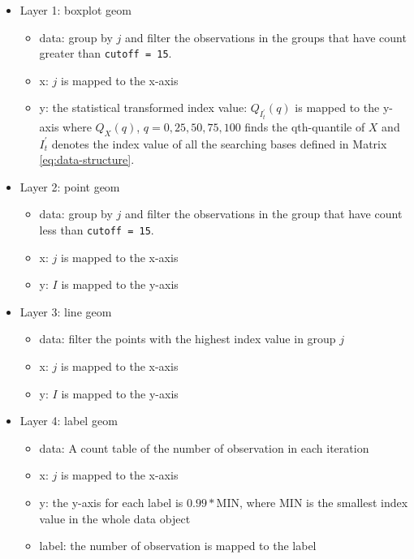 \documentclass[12pt]{article}
\providecommand{\tightlist}{%
  \setlength{\itemsep}{0pt}\setlength{\parskip}{0pt}}
\begin{document}
\begin{itemize}
\tightlist
\item
  Layer 1: boxplot geom

  \begin{itemize}
  \tightlist
  \item
    data: group by \(j\) and filter the observations in the groups that
    have count greater than \texttt{cutoff\ =\ 15}.
  \item
    x: \(j\) is mapped to the x-axis
  \item
    y: the statistical transformed index value: \(Q_{I^{\prime}_t}(q)\)
    is mapped to the y-axis where \(Q_X(q)\), \(q = 0, 25, 50, 75, 100\)
    finds the qth-quantile of \(X\) and \(I^{\prime}_t\) denotes the
    index value of all the searching bases defined in Matrix
    \ref{eq:data-structure}.
  \end{itemize}
\item
  Layer 2: point geom

  \begin{itemize}
  \tightlist
  \item
    data: group by \(j\) and filter the observations in the group that
    have count less than \texttt{cutoff\ =\ 15}.
  \item
    x: \(j\) is mapped to the x-axis
  \item
    y: \(I\) is mapped to the y-axis
  \end{itemize}
\item
  Layer 3: line geom

  \begin{itemize}
  \tightlist
  \item
    data: filter the points with the highest index value in group \(j\)
  \item
    x: \(j\) is mapped to the x-axis
  \item
    y: \(I\) is mapped to the y-axis
  \end{itemize}
\item
  Layer 4: label geom

  \begin{itemize}
  \tightlist
  \item
    data: A count table of the number of observation in each iteration
  \item
    x: \(j\) is mapped to the x-axis
  \item
    y: the y-axis for each label is \(0.99 * \text{MIN}\), where
    \(\text{MIN}\) is the smallest index value in the whole data object
  \item
    label: the number of observation is mapped to the label
  \end{itemize}
\end{itemize}
\end{document}
